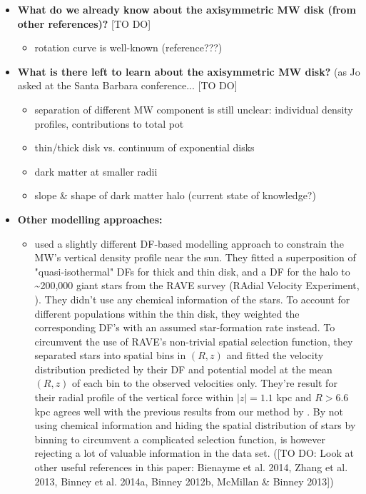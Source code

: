 \begin{itemize}
\item \textbf{What do we already know about the axisymmetric MW disk (from other references)?} [TO DO]
\begin{itemize}
\item rotation curve is well-known (reference???)
\end{itemize}

\item \textbf{What is there left to learn about the axisymmetric MW disk?} (as Jo asked at the Santa Barbara conference... [TO DO]
\begin{itemize}
\item separation of different MW component is still unclear: individual density profiles, contributions to total pot
\item thin/thick disk vs. continuum of exponential disks
\item dark matter at smaller radii
\item slope \& shape of dark matter halo (current state of knowledge?)
\end{itemize} 

\item \textbf{Other modelling approaches:}
\begin{itemize}
\item \citet{pif14} used a slightly different DF-based modelling approach to constrain the MW's vertical density profile near the sun. They fitted a superposition of "quasi-isothermal" DFs for thick and thin disk, and a DF for the halo to \textasciitilde200,000 giant stars from the RAVE survey (RAdial Velocity Experiment, \citet{ste06}). They didn't use any chemical information of the stars. To account for different populations within the thin disk, they weighted the corresponding DF's with an assumed star-formation rate instead. To circumvent the use of RAVE's non-trivial spatial selection function, they separated stars into spatial bins in $(R,z)$ and fitted the velocity distribution predicted by their DF and potential model at the mean $(R,z)$ of each bin to the observed velocities only. They're result for their radial profile of the vertical force within $|z|=1.1$ kpc and $R>6.6$ kpc agrees well with the previous results from our method by \citet{bov13}. By not using chemical information and hiding the spatial distribution of stars by binning to circumvent a complicated selection function, \citet{pif14} is however rejecting a lot of valuable information in the data set. ([TO DO: Look at other useful references in this paper: Bienayme et al. 2014, Zhang et al. 2013, Binney et al. 2014a, Binney 2012b, McMillan \& Binney 2013])
\end{itemize}




\end{itemize}
